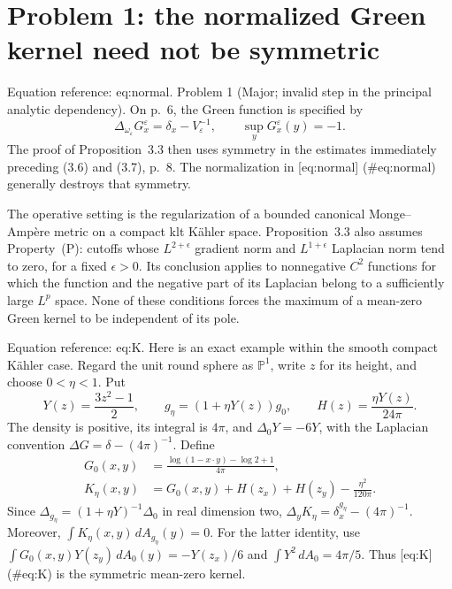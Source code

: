 \documentclass[10pt]{article}
\begin{document}
\section*{Problem 1: the normalized Green kernel need not be symmetric}
Equation reference: eq:normal. Problem 1 (Major; invalid step in the principal analytic dependency).  On p. 6, the Green function is specified by \[
 \Delta_{\omega_\varepsilon}G_x^\varepsilon
 =\delta_x-V_\varepsilon^{-1},
 \qquad \sup_yG_x^\varepsilon(y)=-1.\] The proof of Proposition 3.3 then uses symmetry in the estimates immediately preceding (3.6) and (3.7), p. 8. The normalization in [eq:normal] (\#eq:normal) generally destroys that symmetry.\par
The operative setting is the regularization of a bounded canonical Monge–Ampère metric on a compact klt Kähler space. Proposition 3.3 also assumes Property (P): cutoffs whose \(L^{2+\epsilon}\) gradient norm and \(L^{1+\epsilon}\) Laplacian norm tend to zero, for a fixed \(\epsilon>0\). Its conclusion applies to nonnegative \(C^2\) functions for which the function and the negative part of its Laplacian belong to a sufficiently large \(L^p\) space. None of these conditions forces the maximum of a mean-zero Green kernel to be independent of its pole.\par
Equation reference: eq:K. Here is an exact example within the smooth compact Kähler case. Regard the unit round sphere as \(\mathbb P^1\), write \(z\) for its height, and choose \(0<\eta<1\). Put \[Y(z)=\frac{3z^2-1}{2},\qquad
 g_\eta=(1+\eta Y(z))g_0,\qquad H(z)=\frac{\eta Y(z)}{24\pi}.\] The density is positive, its integral is \(4\pi\), and \(\Delta_0Y=-6Y\), with the Laplacian convention \(\Delta G=\delta-(4\pi)^{-1}\). Define \[\begin{aligned}
 G_0(x,y)&=\frac{\log(1-x\cdot y)-\log2+1}{4\pi},\\
 K_\eta(x,y)&=G_0(x,y)+H(z_x)+H(z_y)-\frac{\eta^2}{120\pi}.
 \end{aligned}\] Since \(\Delta_{g_\eta}=(1+\eta Y)^{-1}\Delta_0\) in real dimension two, \(\Delta_yK_\eta=\delta_x^{g_\eta}-(4\pi)^{-1}\). Moreover, \(\int K_\eta(x,y)\,dA_{g_\eta}(y)=0\). For the latter identity, use \(\int G_0(x,y)Y(z_y)\,dA_0(y)=-Y(z_x)/6\) and \(\int Y^2\,dA_0=4\pi/5\). Thus [eq:K] (\#eq:K) is the symmetric mean-zero kernel.\par
\end{document}
